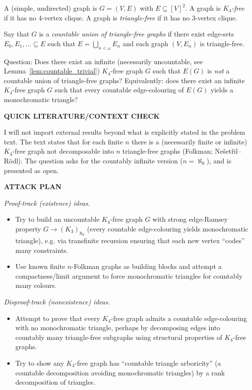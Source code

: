 A (simple, undirected) graph is $G=(V,E)$ with $E\subseteq [V]^2$.
A graph is \emph{$K_4$-free} if it has no 4-vertex clique.
A graph is \emph{triangle-free} if it has no 3-vertex clique.

Say that $G$ is a \emph{countable union of triangle-free graphs} if there exist edge-sets $E_0,E_1,\dots\subseteq E$ such that $E=\bigcup_{n<\omega} E_n$ and each graph $(V,E_n)$ is triangle-free.

Question: Does there exist an infinite (necessarily uncountable, see Lemma~\ref{lem:countable_trivial}) $K_4$-free graph $G$ such that $E(G)$ is \emph{not} a countable union of triangle-free graphs?
Equivalently: does there exist an infinite $K_4$-free graph $G$ such that every countable edge-colouring of $E(G)$ yields a monochromatic triangle?

\bigskip
\noindent\textbf{QUICK LITERATURE/CONTEXT CHECK}

I will not import external results beyond what is explicitly stated in the problem text.
The text states that for each finite $n$ there is a (necessarily finite or infinite) $K_4$-free graph not decomposable into $n$ triangle-free graphs (Folkman; Ne\v{s}et\v{r}il--R\"{o}dl).
The question asks for the countably infinite version ($n=\aleph_0$), and is presented as open.

\bigskip
\noindent\textbf{ATTACK PLAN}

\emph{Proof-track (existence) ideas.}
\begin{itemize}
\item Try to build an uncountable $K_4$-free graph $G$ with strong edge-Ramsey property $G\to(K_3)_{\aleph_0}$ (every countable edge-colouring yields monochromatic triangle), e.g. via transfinite recursion ensuring that each new vertex ``codes'' many constraints.
\item Use known finite $n$-Folkman graphs as building blocks and attempt a compactness/limit argument to force monochromatic triangles for countably many colours.
\end{itemize}

\emph{Disproof-track (nonexistence) ideas.}
\begin{itemize}
\item Attempt to prove that every $K_4$-free graph admits a countable edge-colouring with no monochromatic triangle, perhaps by decomposing edges into countably many triangle-free subgraphs using structural properties of $K_4$-free graphs.
\item Try to show any $K_4$-free graph has ``countable triangle arboricity'' (a countable decomposition avoiding monochromatic triangles) by a rank decomposition of triangles.
\end{itemize}

